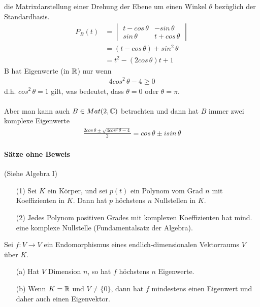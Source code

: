 die Matrixdarstellung einer Drehung der Ebene um einen Winkel $\theta$ bezüglich der Standardbasis.
\begin{align}
P_B(t) &= \begin{vmatrix} t-cos\, \theta & -sin\, \theta \\ sin\, \theta & t+cos\, \theta\end{vmatrix}\\
&= (t - cos\, \theta) + sin^2\,\theta \\
&= t^2 - (2 cos\, \theta)t+1
\end{align}
B hat Eigenwerte (in $\mathbb{R}$) nur wenn
\begin{align}
4 cos^2\, \theta - 4 \geq 0
\end{align}
d.h. $cos^2 \, \theta = 1$ gilt, was bedeutet, dass $\theta = 0$ oder $\theta = \pi$. \\\\
Aber man kann auch $B \in Mat(2, \mathbb{C})$ betrachten und dann hat $B$ immer zwei komplexe Eigenwerte
\begin{align}
\frac{2 cos\, \theta \pm \sqrt{4 cos^2\, \theta -4}}{2} = cos\, \theta \pm i sin\, \theta
\end{align}

\paragraph{Sätze ohne Beweis} (Siehe Algebra I)
\begin{itemize}
 \item[(1)] Sei $K$ ein Körper, und sei $p(t)$ ein Polynom vom Grad $n$ mit Koeffizienten in $K$. Dann hat $p$ höchstens $n$ Nullstellen in $K$.
 \item[(2)] Jedes Polynom positiven Grades mit komplexen Koeffizienten hat mind. eine komplexe Nullstelle (Fundamentalsatz der Algebra).
\end{itemize}

\begin{korollar} %
\label{korollar233}
Sei $f: V \rightarrow V$ ein Endomorphismus eines endlich-dimensionalen Vektorraums $V$ über $K$.
\begin{itemize}
\item[(a)] Hat $V$ Dimension $n$, so hat $f$ höchstens $n$ Eigenwerte.
\item[(b)] Wenn $K = \mathbb{R}$ und $V \neq \{0\}$, dann hat $f$ mindestens einen Eigenwert und daher auch einen Eigenvektor.
\end{itemize}
\end{korollar}

